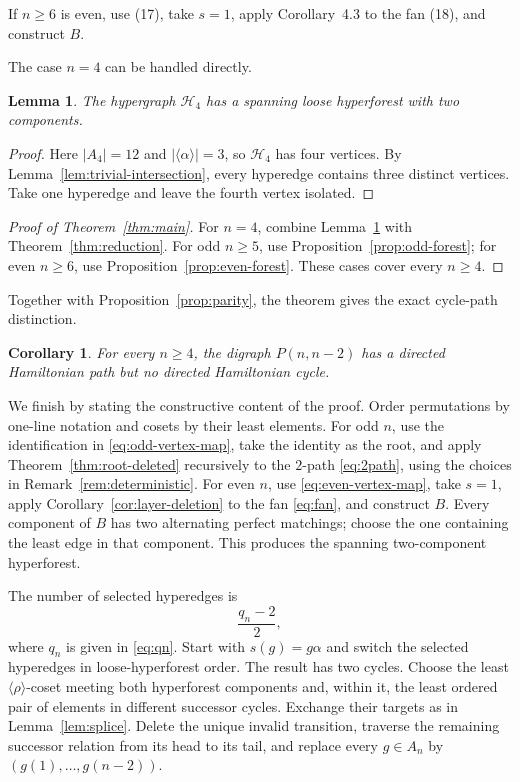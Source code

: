 \documentclass[4pt]{article} %
\newtheorem{lemma}[theorem]{Lemma}
\newtheorem{corollary}[theorem]{Corollary}
\newcommand{\la}{\langle}
\newcommand{\ra}{\rangle}
\begin{document}
If \(n\ge6\) is even, use (17), take \(s=1\), apply Corollary~4.3 to
the fan (18), and construct \(B\).

The case $n=4$ can be handled directly.

\begin{lemma}\label{lem:n4}
The hypergraph $\mathcal H_4$ has a spanning loose hyperforest with two
components.
\end{lemma}

\begin{proof}
Here $|A_4|=12$ and $|\la\alpha\ra|=3$, so $\mathcal H_4$ has four
vertices. By Lemma~\ref{lem:trivial-intersection}, every hyperedge contains
three distinct vertices. Take one hyperedge and leave the fourth vertex
isolated.
\end{proof}

\begin{proof}[Proof of Theorem~\ref{thm:main}]
For $n=4$, combine Lemma~\ref{lem:n4} with
Theorem~\ref{thm:reduction}. For odd $n\geq5$, use
Proposition~\ref{prop:odd-forest}; for even $n\geq6$, use
Proposition~\ref{prop:even-forest}. These cases cover every $n\geq4$.
\end{proof}

Together with Proposition~\ref{prop:parity}, the theorem gives the exact
cycle-path distinction.

\begin{corollary}\label{cor:cycle-path}
For every $n\geq4$, the digraph $P(n,n-2)$ has a directed Hamiltonian path
but no directed Hamiltonian cycle.
\end{corollary}

We finish by stating the constructive content of the proof. Order
permutations by one-line notation and cosets by their least elements. For odd
$n$, use the identification in \eqref{eq:odd-vertex-map}, take the identity
as the root, and apply Theorem~\ref{thm:root-deleted} recursively to the
$2$-path \eqref{eq:2path}, using the choices in
Remark~\ref{rem:deterministic}. For even $n$, use
\eqref{eq:even-vertex-map}, take $s=1$, apply
Corollary~\ref{cor:layer-deletion} to the fan \eqref{eq:fan}, and construct
$B$. Every component of $B$ has two alternating perfect matchings; choose
the one containing the least edge in that component. This produces the
spanning two-component hyperforest.

The number of selected hyperedges is
\begin{equation}\label{eq:forest-size}
 \frac{q_n-2}{2},
\end{equation}
where $q_n$ is given in \eqref{eq:qn}. Start with $s(g)=g\alpha$ and switch
the selected hyperedges in loose-hyperforest order. The result has two
cycles. Choose the least $\la\rho\ra$-coset meeting both hyperforest
components and, within it, the least ordered pair of elements in different
successor cycles. Exchange their targets as in Lemma~\ref{lem:splice}.
Delete the unique invalid transition, traverse the remaining successor
relation from its head to its tail, and replace every $g\in A_n$ by
$(g(1),\ldots,g(n-2))$.
\end{document}
